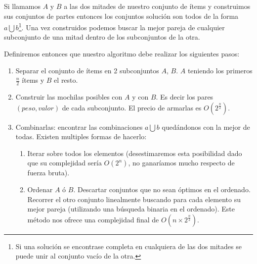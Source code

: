 \documentclass[fleqn, 11pt]{article}
\begin{document}
Si llamamos $A$ y $B$ a las dos mitades de nuestro conjunto de ítems y
construimos sus conjuntos de partes entonces los conjuntos solución son todos
de la forma $a \bigcup b$\footnote{Si una solución se encontrase completa en
cualquiera de las dos mitades se puede unir al conjunto vacío de la otra.}. Una
vez construidos podemos buscar la mejor pareja de cualquier subconjunto de una
mitad dentro de los subconjuntos de la otra.

Definiremos entonces que nuestro algoritmo debe realizar los siguientes pasos:

\begin{enumerate}
\item Separar el conjunto de ítems en 2 subconjuntos $A$, $B$. $A$ teniendo los
primeros $\frac{n}{2}$ ítems y $B$ el resto.

\item Construir las mochilas posibles con $A$ y con $B$. Es decir los pares
$(peso, valor)$ de cada subconjunto. El precio de armarlas es
$O(2^{\frac{n}{2}})$.

\item Combinarlas: encontrar las combinaciones $a \bigcup b$ quedándonos con la
mejor de todas. Existen multiples formas de hacerlo:

\begin{enumerate}
	\item Iterar sobre todos los elementos (desestimaremos esta posibilidad
	dado que su complejidad sería $O(2^n)$, no ganaríamos mucho respecto de
	fuerza bruta).

	\item Ordenar $A$ ó $B$. Descartar conjuntos que no sean óptimos en el
	ordenado. Recorrer el otro conjunto linealmente buscando para cada
	elemento su mejor pareja (utilizando una búsqueda binaria en el
	ordenado). Este método nos ofrece una complejidad final de $O(n \times
	2^{\frac{n}{2}})$.
\end{enumerate}
\end{enumerate}
\end{document}
